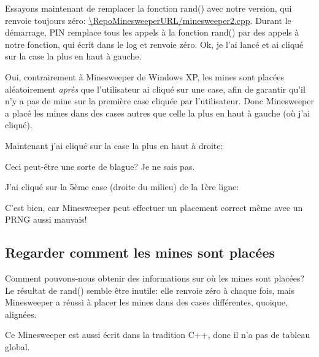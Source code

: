 Essayons maintenant de remplacer la fonction rand() avec notre version, qui renvoie
toujours zéro: \url{\RepoMinesweeperURL/minesweeper2.cpp}.
Durant le démarrage, PIN remplace tous les appels à la fonction rand() par des appels
à notre fonction, qui écrit dans le log et renvoie zéro.
Ok, je l'ai lancé et ai cliqué sur la case la plus en haut à gauche.

\begin{figure}[H]
\centering
{}
\end{figure}

Oui, contrairement à Minesweeper de Windows XP, les mines sont placées aléatoirement
\emph{après} que l'utilisateur ai cliqué sur une case, afin de garantir qu'il n'y
a pas de mine sur la première case cliquée par l'utilisateur.
Donc Minesweeper a placé les mines dans des cases autres que celle la plus en
haut à gauche (où j'ai cliqué).

Maintenant j'ai cliqué sur la case la plus en haut à droite:

\begin{figure}[H]
\centering
{}
\end{figure}

Ceci peut-être une sorte de blague? Je ne sais pas.

J'ai cliqué sur la 5ème case (droite du milieu) de la 1ère ligne:

\begin{figure}[H]
\centering
{}
\end{figure}

C'est bien, car Minesweeper peut effectuer un placement correct même avec un \ac{PRNG}
aussi mauvais!

\subsection{Regarder comment les mines sont placées}

Comment pouvons-nous obtenir des informations sur où les mines sont placées?
Le résultat de rand() semble être inutile: elle renvoie zéro à chaque fois, mais
Minesweeper a réussi à placer les mines dans des cases différentes, quoique, alignées.

Ce Minesweeper est aussi écrit dans la tradition C++, donc il n'a pas de tableau
global.

